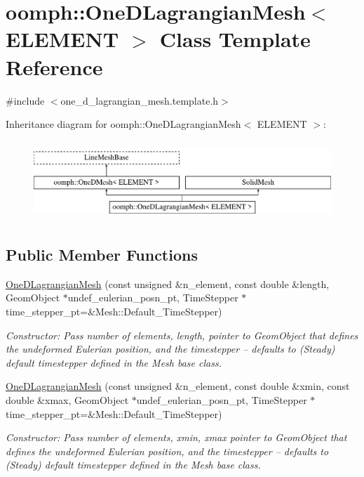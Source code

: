 \hypertarget{classoomph_1_1OneDLagrangianMesh}{}\section{oomph\+:\+:One\+D\+Lagrangian\+Mesh$<$ E\+L\+E\+M\+E\+NT $>$ Class Template Reference}
\label{classoomph_1_1OneDLagrangianMesh}


{\ttfamily \#include $<$one\+\_\+d\+\_\+lagrangian\+\_\+mesh.\+template.\+h$>$}

Inheritance diagram for oomph\+:\+:One\+D\+Lagrangian\+Mesh$<$ E\+L\+E\+M\+E\+NT $>$\+:\begin{figure}[H]
\begin{center}
\leavevmode
\includegraphics[height=3.000000cm]{classoomph_1_1OneDLagrangianMesh}
\end{center}
\end{figure}
\subsection*{Public Member Functions}
\begin{DoxyCompactItemize}
\item 
\hyperlink{classoomph_1_1OneDLagrangianMesh_a7061998be3fb4131c6b58c4943595d49}{One\+D\+Lagrangian\+Mesh} (const unsigned \&n\+\_\+element, const double \&length, Geom\+Object $\ast$undef\+\_\+eulerian\+\_\+posn\+\_\+pt, Time\+Stepper $\ast$time\+\_\+stepper\+\_\+pt=\&Mesh\+::\+Default\+\_\+\+Time\+Stepper)
\begin{DoxyCompactList}\small\item\em Constructor\+: Pass number of elements, length, pointer to Geom\+Object that defines the undeformed Eulerian position, and the timestepper -- defaults to (Steady) default timestepper defined in the Mesh base class. \end{DoxyCompactList}\item 
\hyperlink{classoomph_1_1OneDLagrangianMesh_a20e1ab05b023f65bea5503938cd70385}{One\+D\+Lagrangian\+Mesh} (const unsigned \&n\+\_\+element, const double \&xmin, const double \&xmax, Geom\+Object $\ast$undef\+\_\+eulerian\+\_\+posn\+\_\+pt, Time\+Stepper $\ast$time\+\_\+stepper\+\_\+pt=\&Mesh\+::\+Default\+\_\+\+Time\+Stepper)
\begin{DoxyCompactList}\small\item\em Constructor\+: Pass number of elements, xmin, xmax pointer to Geom\+Object that defines the undeformed Eulerian position, and the timestepper -- defaults to (Steady) default timestepper defined in the Mesh base class. \end{DoxyCompactList}\end{DoxyCompactItemize}

